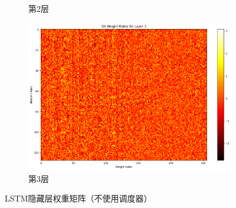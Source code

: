 \begin{figure}[H]
\begin{subfigure}{0.3\textwidth}
        \caption{第2层}
        \label{fig:lstmweightmatrixforlayer2noscheduler}
    \end{subfigure}
    \hfill
    \begin{subfigure}{0.3\textwidth}
        \includegraphics[width=\linewidth]{../output/lstm/no scheduler/i2h Weight Matrix for Layer 3.png}
        \caption{第3层}
        \label{fig:lstmweightmatrixforlayer3noscheduler}
    \end{subfigure}
    \caption{LSTM隐藏层权重矩阵（不使用调度器）}
    \label{fig:lstmweightmatrixnoscheduler}
\end{figure}

